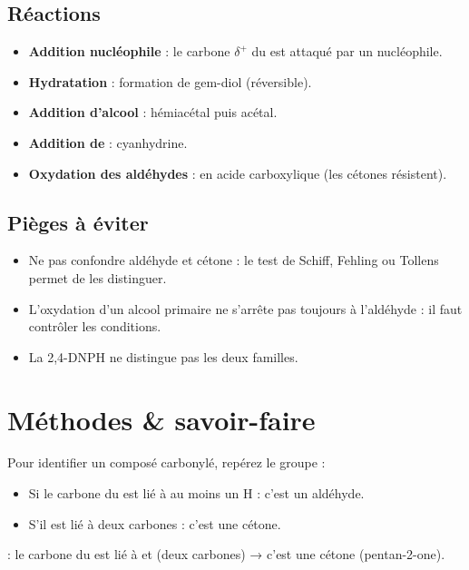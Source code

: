 \begin{synthese}
\subsection*{Réactions}
\begin{itemize}
    \item \textbf{Addition nucléophile} : le carbone $\delta^+$ du  est attaqué par un nucléophile.
    \item \textbf{Hydratation} : formation de gem-diol (réversible).
    \item \textbf{Addition d'alcool} : hémiacétal puis acétal.
    \item \textbf{Addition de } : cyanhydrine.
    \item \textbf{Oxydation des aldéhydes} : en acide carboxylique (les cétones résistent).
\end{itemize}

\subsection*{Pièges à éviter}
\begin{itemize}
    \item Ne pas confondre aldéhyde et cétone : le test de Schiff, Fehling ou Tollens permet de les distinguer.
    \item L'oxydation d'un alcool primaire ne s'arrête pas toujours à l'aldéhyde : il faut contrôler les conditions.
    \item La 2,4-DNPH ne distingue pas les deux familles.
\end{itemize}
\end{synthese}

\section{Méthodes \& savoir-faire}

Pour identifier un composé carbonylé, repérez le groupe  :
\begin{itemize}
    \item Si le carbone du  est lié à au moins un H : c'est un aldéhyde.
    \item S'il est lié à deux carbones : c'est une cétone.
\end{itemize}
\begin{exemple}
 : le carbone du  est lié à  et  (deux carbones) → c'est une cétone (pentan-2-one).
\end{exemple}

